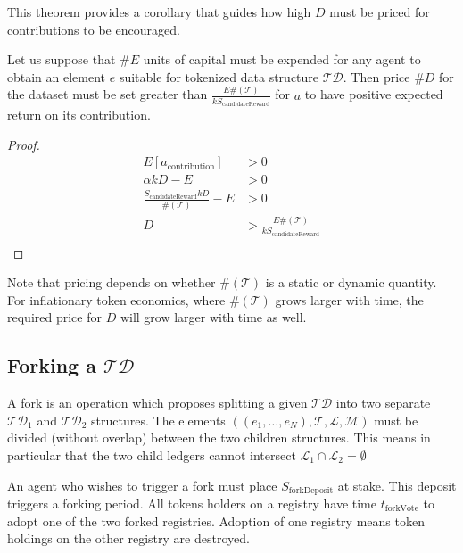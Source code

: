 \documentclass{llncs}
\begin{document}
This theorem provides a corollary that guides how high $D$ must be priced for contributions to be encouraged.

\begin{corollary}
Let us suppose that $\# E$ units of capital must be expended for any agent to obtain an element $e$ suitable for tokenized data structure $\mathcal{TD}$. Then price $\#D$ for the dataset must be set greater than $\frac{E\#(\mathcal{T})}{kS_\text{candidateReward}}$ for $a$ to have positive expected return on its contribution.
\end{corollary}
\begin{proof}
\begin{align*}
    E[a_\text{contribution}] &> 0 \\
    \alpha k D - E &> 0 \\
    \frac{S_\text{candidateReward} k D}{\#(\mathcal{T})} - E &> 0 \\
    D &> \frac{E\#(\mathcal{T})}{kS_\text{candidateReward}} \\
\end{align*}
\end{proof}

Note that pricing depends on whether $\#(\mathcal{T})$ is a static or dynamic quantity. For inflationary token economics, where $\#(\mathcal{T})$ grows larger with time, the required price for $D$ will grow larger with time as well.

\subsection{Forking a $\mathcal{TD}$}

\begin{definition}[Forks]
A fork is an operation which proposes splitting a given $\mathcal{TD}$ into two separate $\mathcal{TD}_1$ and $\mathcal{TD}_2$ structures. The elements $((e_1,\dotsc,e_N), \mathcal{T}, \mathcal{L}, \mathcal{M})$ must be divided (without overlap) between the two children structures. This means in particular that the two child ledgers cannot intersect $\mathcal{L}_1 \cap \mathcal{L}_2 = \emptyset$
\end{definition}

An agent who wishes to trigger a fork must place $S_\text{forkDeposit}$ at stake. This deposit triggers a forking period. All tokens holders on a registry have time $t_\text{forkVote}$ to adopt one of the two forked registries.
Adoption of one registry means token holdings on the other registry are destroyed.
\end{document}
